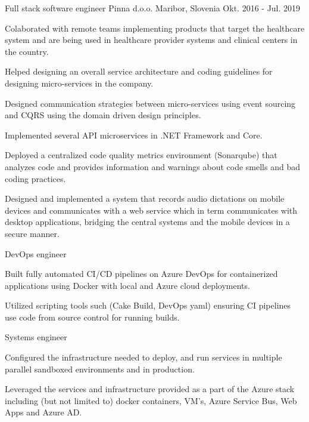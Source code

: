 \begin{cventries}
  \cventry
    {Full stack software engineer} %
    {Pinna d.o.o.} %
    {Maribor, Slovenia} %
    {Okt. 2016 - Jul. 2019} %
    {
      \begin{cvitems} %
        \item {Colaborated with remote teams implementing products that 
        target the healthcare system and are being used in healthcare
         provider systems and clinical centers in the country.}
        \item {Helped designing an overall service architecture 
        and coding guidelines for designing micro-services in the company.}
        \item {Designed communication strategies between micro-services 
        using event sourcing and CQRS using the domain driven design principles.}
        \item {Implemented several API microservices in .NET Framework and Core.}
        \item {Deployed a centralized code quality metrics environment 
        (Sonarqube) that analyzes code and provides information and 
        warnings about code smells and bad coding practices.}
        \item {Designed and implemented a system that records audio 
        dictations on mobile devices and communicates with a web 
        service which in term communicates with desktop applications,
         bridging the central systems and the mobile devices in a secure manner.}
      \end{cvitems}
    }
    \cventry
    {DevOps engineer} %
    {} %
    {} %
    {} %
    {
      \begin{cvitems} %
        \item {Built fully automated CI/CD pipelines on Azure
         DevOps for containerized applications using Docker with local 
         and Azure cloud deployments.}
        \item {Utilized scripting tools such (Cake Build, DevOps yaml) 
        ensuring CI pipelines use code from source control for running builds.\\}
      \end{cvitems}
    }
    \cventry
    {Systems engineer} %
    {} %
    {} %
    {} %
    {
      \begin{cvitems} %
        \item {Configured the infrastructure needed to deploy, 
        and run services in multiple parallel sandboxed environments 
        and in production.}
        \item {Leveraged the services and infrastructure provided as a
         part of the Azure stack including (but not limited to) 
         docker containers, VM's, Azure Service Bus, Web Apps and Azure AD.\\}
      \end{cvitems}
    }


\end{cventries}
